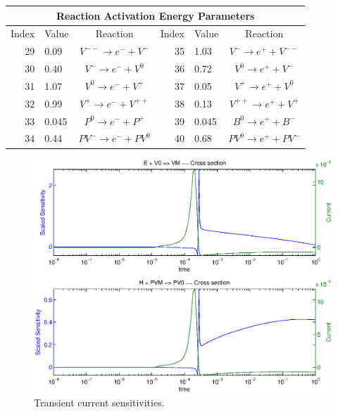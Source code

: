 \documentclass[pdf,ps2pdf,11pt]{SANDreport}
\begin{document}
{\begin{table}[htb]
\begin{center}
\begin{tabular}{|r|l|c|r|l|c|}
\hline 
\multicolumn{6}{|c|}{Reaction Activation Energy Parameters} \\
\hline
\multicolumn{1}{|c|}{Index} & 
\multicolumn{1}{c|}{Value} & 
\multicolumn{1}{c|}{Reaction} & 
\multicolumn{1}{c|}{Index} & 
\multicolumn{1}{c|}{Value} & 
\multicolumn{1}{c|}{Reaction} \\ 
\hline\hline
29 & 0.09 & $V^{--} \rightarrow e^- + V^-$ & 35 & 1.03 & $V^- \rightarrow e^+ + V^{--}$ \\
30 & 0.40 & $V^- \rightarrow e^- + V^0$    & 36 & 0.72 & $V^0 \rightarrow e^+ + V^-$    \\
31 & 1.07 & $V^0 \rightarrow e^- + V^+$    & 37 & 0.05 & $V^+ \rightarrow e^+ + V^0$    \\
32 & 0.99 & $V^+ \rightarrow e^- + V^{++}$ & 38 & 0.13 & $V^{++} \rightarrow e^+ + V^+$ \\ 
33 & 0.045 & $P^0 \rightarrow e^- + P^+$    & 39 & 0.045 & $B^0 \rightarrow e^+ + B^-$    \\
34 & 0.44 & $PV^- \rightarrow e^- + PV^0$  & 40 & 0.68 & $PV^0 \rightarrow e^+ + PV^-$  \\
\hline
\end{tabular}
\end{center}
\end{table}
\esinglespace}

{\bsinglespace
\begin{figure}[p]
\begin{center}
\includegraphics*[width=5in]{sensitivities_full_report_1}
\end{center}
\caption[Transient current sensitivities]{
\label{fig:SensitivitesFull}
Transient current sensitivities.}
\end{figure}
\esinglespace}
\end{document}
